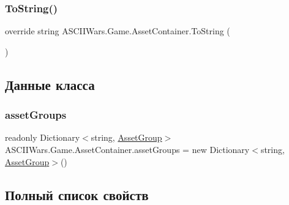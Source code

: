 \subsubsection{\texorpdfstring{To\+String()}{ToString()}}
{\footnotesize\ttfamily override string A\+S\+C\+I\+I\+Wars.\+Game.\+Asset\+Container.\+To\+String (\begin{DoxyParamCaption}{ }\end{DoxyParamCaption})\hspace{0.3cm}{\ttfamily [inline]}}



\subsection{Данные класса}
\hypertarget{class_a_s_c_i_i_wars_1_1_game_1_1_asset_container_afc2c4d42edc386fa6bdbf561546b2083}{}\label{class_a_s_c_i_i_wars_1_1_game_1_1_asset_container_afc2c4d42edc386fa6bdbf561546b2083} 
\subsubsection{\texorpdfstring{asset\+Groups}{assetGroups}}
{\footnotesize\ttfamily readonly Dictionary$<$string, \hyperlink{class_a_s_c_i_i_wars_1_1_game_1_1_asset_group}{Asset\+Group}$>$ A\+S\+C\+I\+I\+Wars.\+Game.\+Asset\+Container.\+asset\+Groups = new Dictionary$<$string, \hyperlink{class_a_s_c_i_i_wars_1_1_game_1_1_asset_group}{Asset\+Group}$>$()}



\subsection{Полный список свойств}
\hypertarget{class_a_s_c_i_i_wars_1_1_game_1_1_asset_container_ae7149eab74d76098eca27b20d49d0bf9}{}\label{class_a_s_c_i_i_wars_1_1_game_1_1_asset_container_ae7149eab74d76098eca27b20d49d0bf9} 
